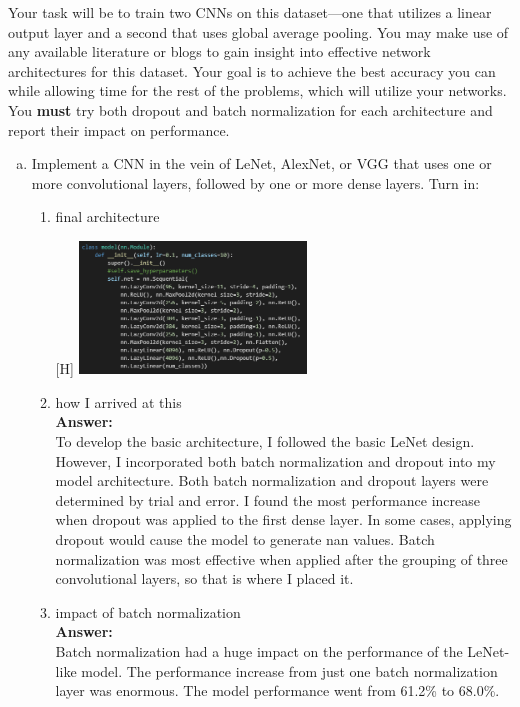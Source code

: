 \documentclass{article}[12pt]
\begin{document}
Your task will be to train two CNNs on this dataset---one that utilizes a linear output layer and a second that uses global average pooling. You may make use of any available literature or blogs to gain insight into effective network architectures for this dataset. Your goal is to achieve the best accuracy you can while allowing time for the rest of the problems, which will utilize your networks. You \textbf{must} try both dropout and batch normalization for each architecture and report their impact on performance.

\begin{enumerate}[(a)]
    \item Implement a CNN in the vein of LeNet, AlexNet, or VGG that uses one or more convolutional layers, followed by one or more dense layers. Turn in:

    \begin{enumerate}
        \item final architecture
        \begin{center}[H]
            \includegraphics[width=0.5\textwidth]{oldmodel_architecture.png}
        \end{center}

        \item how I arrived at this\\
        \textbf{Answer:}\\
        To develop the basic architecture, I followed the basic LeNet design. However, I incorporated both batch normalization and dropout into my model architecture. Both batch normalization and dropout layers were determined by trial and error. I found the most performance increase when dropout was applied to the first dense layer. In some cases, applying dropout would cause the model to generate nan values. Batch normalization was most effective when applied after the grouping of three convolutional layers, so that is where I placed it.
        
        \item impact of batch normalization\\
        \textbf{Answer:}\\
        Batch normalization had a huge impact on the performance of the LeNet-like model. The performance increase from just one batch normalization layer was enormous. The model performance went from 61.2\% to 68.0\%. 
        

\end{enumerate}
\end{enumerate}
\end{document}
